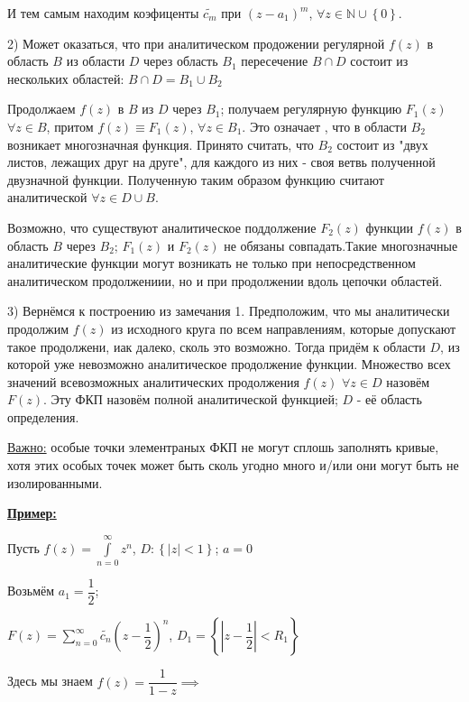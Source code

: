 \documentclass[a4paper, 12pt]{article}
\begin{document}
 \quad И тем самым находим коэфиценты $\tilde{c_m}$ при $(z - a_1)^m$, $\forall z \in \mathbb{N} \cup \left\{ 0 \right\} $. 
 
 2) Может оказаться, что при аналитическом продожении регулярной $f(z)$ в область $B$ из области $D$ через область $B_1$ пересечение $B \cap D$ состоит из нескольких областей: $B \cap D = B_1 \cup B_2$
 
 \quad Продолжаем $f(z)$ в $B$ из $D$ через $B_1$; получаем регулярную функцию $F_1(z)$ $\forall z \in B$, притом $f(z) \equiv F_1(z)$, $\forall z \in B_1$. Это означает , что в области $B_2$ возникает многозначная функция. Принято считать, что $B_2$ состоит из "двух листов, лежащих друг на друге", для каждого из них - своя ветвь полученной двузначной функции. Полученную таким образом функцию считают аналитической $\forall z \in D \cup B$.
 
 \quad Возможно, что существуют аналитическое поддолжение $F_2(z)$ функции $f(z)$ в область $B$ через $B_2$; $F_1(z)$ и $F_2(z)$ не обязаны совпадать.Такие многозначные  аналитические функции могут возникать не только при непосредственном аналитическом продолжениии, но и при продолжении вдоль цепочки областей.
 
 3) Вернёмся к построению из замечания 1. Предположим, что мы аналитически продолжим $f(z)$ из исходного круга по всем направлениям, которые допускают такое продолжени,  иак далеко, сколь это возможно. Тогда придём к области $D$, из которой уже невозможно аналитическое продолжение функции. Множество всех значений всевозможных аналитических продолжения $f(z)$ $\forall z \in D $ назовём $F(z)$. Эту ФКП назовём полной аналитической функцией; $D $ - её область определения.
 
 \quad \underline{Важно:} особые точки элементраных ФКП не могут сплошь заполнять кривые, хотя этих особых  точек может быть сколь угодно много и/или они могут быть не изолированными.
 
 \quad \textbf{\underline{Пример:}}

 \quad Пусть $f(z) = \displaystyle\int\limits_{n=0}^{\infty} z^n$, $D : \left\{ |z| < 1 \right\}$; $a = 0$
 
 \quad Возьмём $a_1 = \dfrac{1}{2}$;

 \begin{center}
   $F(z) = \displaystyle\sum\limits_{n=0}^{\infty} \tilde{c_n} (z-\dfrac{1}{2})^n$, $D_1 = \left\{ \left|z - \dfrac{1}{2}\right| < R_1 \right\}$
 \end{center}

 \quad Здесь мы знаем $f(z) = \dfrac{1}{1-z} \implies $
\end{document}
